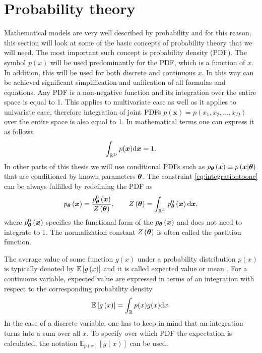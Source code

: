 \section{Probability theory}
Mathematical models are very well described by probability and for this reason, this section will look at some of the basic concepts of probability theory that we will need. The most important such concept is probability density (PDF). The symbol $p(x)$ will be used predominantly for the PDF, which is a function of $x$.  In addition, this will be used for both discrete and continuous $x$. In this way can be achieved significant simplification and unification of all formulas and equations. Any PDF is a non-negative function and its integration over the entire space is equal to 1. This applies to multivariate case as well as it applies to univariate case, therefore integration of joint PDFs $p(\boldsymbol{x}) = p\left(x_1, x_2, \dots, x_D\right)$ over the entire space is also equal to 1. In mathematical terms one can express it as follows
\begin{equation}\label{eq:integrationtoone}
\int_{\mathbb{R}^D}p(\boldsymbol{x})\mathrm{d}{\boldsymbol{x}} = 1.
\end{equation}
In other parts of this thesis we will use conditional PDFs such as $p_{\boldsymbol{\theta}}\left(\boldsymbol{x}\right) \equiv p\left(\boldsymbol{x}|\boldsymbol{\theta}\right)  $ that are conditioned by known parameters $\boldsymbol{\theta}$. The constraint \eqref{eq:integrationtoone} can be always fulfilled by redefining the PDF as
\begin{equation}
    p_{\boldsymbol{\theta}}\left(\boldsymbol{x}\right) = \frac{p_{\boldsymbol{\theta}}^{0}\left(\boldsymbol{x}\right)}{Z\left(\boldsymbol{\theta}\right)}, \qquad Z\left(\boldsymbol{\theta}\right) = \int_{\mathbb{R}^D} p_{\boldsymbol{\theta}}^0\left(\boldsymbol{x}\right)\mathrm{d}{\boldsymbol{x}}, 
\end{equation}
where $p_{\boldsymbol{\theta}}^{0}\left(\boldsymbol{x}\right)$ specifies the functional form of the $p_{\boldsymbol{\theta}}\left(\boldsymbol{x}\right)$ and does not need to integrate to 1. The normalization constant $Z\left(\boldsymbol{\theta}\right)$ is often called the partition function.

The average value of some function $g(x)$ under a probability distribution $p(x)$ is typically denoted by $\mathbb{E}\left[ g\left(x\right) \right]$ and it is called expected value or mean \cite{bishop}. For a continuous variable, expected value are expressed in terms of an integration with respect to the corresponding probability density
\begin{equation}
	\mathbb{E}\left[ g\left(x\right) \right] = \int_{\mathbb{R}} p(x)g(x)\mathrm{d}{x}.
\end{equation} 
In the case of a discrete variable, one has to keep in mind that an integration turns into a sum over all $x$. To specify over which PDF the expectation is calculated, the notation $\mathbb{E}_{p(x)}\left[g\left(x\right)\right]$ can be used.

